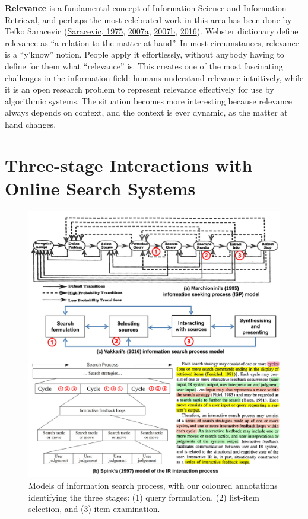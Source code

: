 \documentclass[letterpaper, nobind]{templates/ociamthesis}
\begin{document}
\textbf{Relevance} is a fundamental concept of Information Science and
Information Retrieval, and perhaps the most celebrated work in this area
has been done by Tefko Saracevic
(\protect\hyperlink{ref-saracevic1975relevance}{Saracevic, 1975}, \protect\hyperlink{ref-saracevic2007relevance}{2007a}, \protect\hyperlink{ref-saracevic2007relevancea}{2007b}, \protect\hyperlink{ref-saracevic2016notion}{2016}).
Webster dictionary define relevance as ``a relation to the matter at
hand''. In most circumstances, relevance is a ``y'know'' notion. People
apply it effortlessly, without anybody having to define for them what
``relevance'' is. This creates one of the most fascinating challenges in
the information field: humans understand relevance intuitively, while it
is an open research problem to represent relevance effectively for use
by algorithmic systems. The situation becomes more interesting because
relevance always depends on context, and the context is ever dynamic, as
the matter at hand changes.

\hypertarget{sec-bg-search-3-stage}{%
\section{Three-stage Interactions with Online Search Systems}\label{sec-bg-search-3-stage}}

\begin{figure}

{\centering \includegraphics[width=1\linewidth]{figs/info-search-models} 

}

\caption[Models of information search process.]{Models of information search process, with our coloured annotations identifying the three stages: (1) query formulation, (2) list-item selection, and (3) item examination.}\label{fig:info-search-models}
\end{figure}
\end{document}
